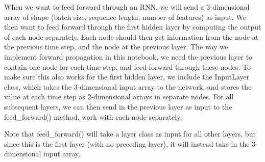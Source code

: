 \documentclass[11pt]{article}
\begin{document}
    When we want to feed forward through an RNN, we will send a
3-dimensional array of shape (batch size, sequence length, number of
features) as input. We then want to feed forward through the first
hidden layer by computing the output of each node separately. Each node
should then get information from the node at the previous time step, and
the node at the previous layer. The way we implement forward propagation
in this notebook, we need the previous layer to contain one node for
each time step, and feed forward through these nodes. To make sure this
also works for the first hidden layer, we include the InputLayer class,
which takes the 3-dimensional input array to the network, and stores the
value at each time step as 2-dimensional arrays in separate nodes. For
all subsequent layers, we can then send in the previous layer as input
to the feed\_forward() method, work with each node separately.

Note that feed\_forward() will take a layer class as input for all other
layers, but since this is the first layer (with no preceding layer), it
will instead take in the 3-dimensional input array.
\end{document}
